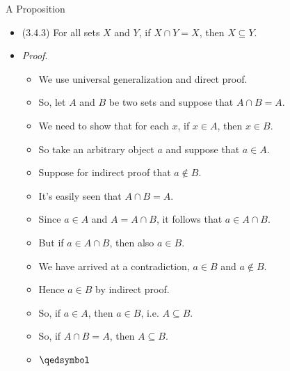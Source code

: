 \documentclass[../slides.tex]{subfiles}
\begin{document}
\begin{frame}{A Proposition}

\begin{itemize}

	\item (3.4.3) For all sets $X$ and $Y$, if $X\cap Y=X$, then $X\subseteq Y$.
	
	\item \emph{Proof}.
		\begin{itemize}
		
			\item We use universal generalization and direct proof.
			
			\item So, let $A$ and $B$ be two sets and suppose that $A\cap B=A$.

			\item We need to show that for each $x$, if $x\in A$, then $x\in B$. 
			
			\item So take an arbitrary object $a$ and suppose that $a\in A$. 
			
			\item Suppose for indirect proof that $a\notin B$. 
			
			\item It's easily seen that $A\cap B=A$.
			
			\item Since $a\in A$ and $A=A\cap B$, it follows that $a\in A\cap B$. 
			
			\item But if $a\in A\cap B$, then also $a\in B$. 
			
			\item We have arrived at a contradiction, $a\in B$ and $a\notin B$. 
			
			\item Hence $a\in B$ by indirect proof.
			
			\item  So, if $a\in A$, then $a\in B$, i.e. $A\subseteq B$.
			
			\item  So, if $A\cap B=A$, then $A\subseteq B$.
			
			\item $\qedsymbol$

	\end{itemize}
	
	\end{itemize}

\end{frame}
\end{document}
